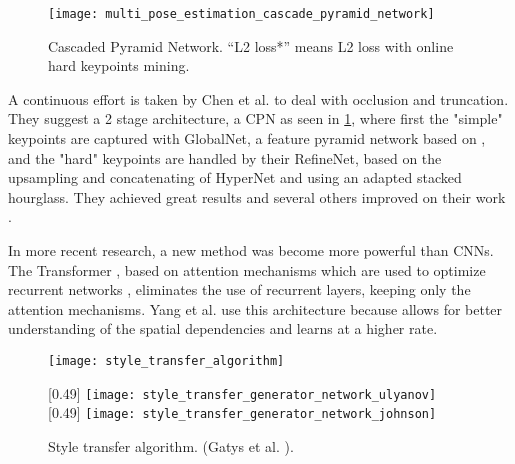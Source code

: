 \begin{figure}
	\centering
	\texttt{[image: multi\_pose\_estimation\_cascade\_pyramid\_network]}%
	\caption{
		Cascaded Pyramid Network. “L2 loss*” means L2 loss with online hard keypoints mining.\cite{Chen2017}
	}
	\label{fig:cascade_pyramid_network}
\end{figure}

A continuous effort is taken by Chen et al. \cite{Chen2017} to deal with occlusion and truncation.
They suggest a 2 stage architecture, a \gls{CPN} as seen in \ref{fig:cascade_pyramid_network},
where first the "simple" keypoints are captured with GlobalNet, a feature pyramid network based on \cite{Lin2016},
and the "hard" keypoints are handled by their RefineNet, based on the upsampling and concatenating of HyperNet \cite{Kong2016} and using an adapted stacked hourglass.
They achieved great results and several others improved on their work \cite{Su2019}\cite{Li2019}.

In more recent research, a new method was become more powerful than \glspl{CNN}.
The Transformer \cite{Vaswani2017}, based on attention mechanisms which are used to optimize recurrent networks \cite{Kim2017}, eliminates the use of recurrent layers, keeping only the attention mechanisms.
Yang et al. \cite{Yang2020} use this architecture because allows for better understanding of the spatial dependencies and learns at a higher rate.

\begin{figure}
	\centering
	\texttt{[image: style\_transfer\_algorithm]}%
	\caption{Style transfer algorithm. (Gatys et al. \cite{Gatys2016}).}
	\label{fig:style_transfer_algorithm}
	\parbox{\textwidth}{
		[0.49\textwidth] {
			\texttt{[image: style\_transfer\_generator\_network\_ulyanov]}%
			\label{fig:style_transfer_generator_network_ulyanov}
		}
		[0.49\textwidth] {
			\texttt{[image: style\_transfer\_generator\_network\_johnson]}%
			\label{fig:style_transfer_generator_network_johnson}
		}	
	}
\end{figure}

